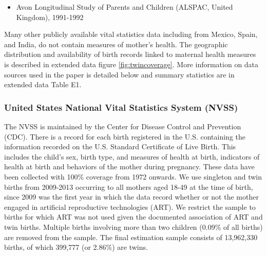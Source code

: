 \documentclass{nature}
\begin{document}
\begin{linenumbers}
\begin{itemize}
\item Avon Longitudinal Study of Parents and Children (ALSPAC, United Kingdom), 1991-1992 \vspace{-4mm}
\end{itemize}
Many other %
publicly available vital statistics data including from Mexico, Spain, and India, do not contain  measures of mother's health.  The geographic distribution and availability of birth records linked to maternal health measures is described in extended data figure \ref{fig:twincoverage}.  %
More information on data sources used in the paper is detailed below and summary statistics are in extended data Table E1.

\subsubsection{United States National Vital Statistics System (NVSS)}
The NVSS is maintained by the Center for Disease Control and Prevention (CDC). %
 There is a record for each birth registered in the U.S. containing the information recorded on the U.S. Standard Certificate of Live Birth. This includes the child's sex, birth type, and measures of health at birth,  indicators of health at birth and behaviors of the mother during pregnancy. These data have been collected with 100\% coverage from 1972 onwards. We use singleton and twin births from 2009-2013\cite{Martinetal2013} occurring to all mothers aged 18-49 at the time of birth, since 2009 was the first year in which the data record whether or not the mother engaged in artificial reproductive technologies (ART).%
We restrict the sample to births for which ART was not used given the documented association of ART and twin births. Multiple births involving more than two children (0.09\% of all births) are removed from the sample. The final estimation sample consists of 13,962,330 births, of which 399,777 (or 2.86\%) are twins.
  


\end{linenumbers}
\end{document}
